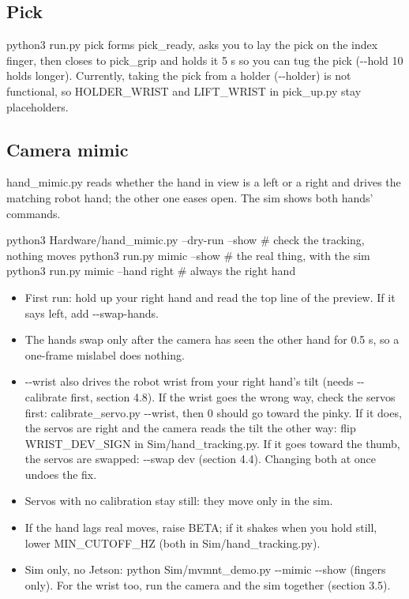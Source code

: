 \documentclass[11pt,letterpaper]{article}
\newcommand{\code}[1]{\textcolor{codeblue}{\ttfamily\smaller\relax #1}}
\begin{document}
\subsection{Pick}
\code{python3 run.py pick} forms \code{pick\_\allowbreak{}ready}, asks you to lay the pick on the index finger, then closes to \code{pick\_\allowbreak{}grip} and holds it 5 s so you can tug the pick (\code{-{}-{}hold 10} holds longer). Currently, taking the pick from a holder (\code{-{}-{}holder}) is not functional, so \code{HOLDER\_\allowbreak{}WRIST} and \code{LIFT\_\allowbreak{}WRIST} in \code{pick\_\allowbreak{}up.py} stay placeholders.


\subsection{Camera mimic}
\code{hand\_\allowbreak{}mimic.py} reads whether the hand in view is a left or a right and drives the matching robot hand; the other one eases open. The sim shows both hands' commands.

\begin{codeblock}
python3 Hardware/hand_mimic.py --dry-run --show   # check the tracking, nothing moves
python3 run.py mimic --show                       # the real thing, with the sim
python3 run.py mimic --hand right                 # always the right hand
\end{codeblock}
\begin{itemize}
  \item First run: hold up your right hand and read the top line of the preview. If it says \code{left}, add \code{-{}-{}swap-{}\allowbreak{}hands}.
  \item The hands swap only after the camera has seen the other hand for 0.5 s, so a one-frame mislabel does nothing.
  \item \code{-{}-{}wrist} also drives the robot wrist from your right hand's tilt (needs \code{-{}-{}calibrate} first, section 4.8). If the wrist goes the wrong way, check the servos first: \code{calibrate\_\allowbreak{}servo.py -{}-{}wrist}, then \code{25 0} should go toward the pinky. If it does, the servos are right and the camera reads the tilt the other way: flip \code{WRIST\_\allowbreak{}DEV\_\allowbreak{}SIGN} in \code{Sim/\allowbreak{}hand\_\allowbreak{}tracking.py}. If it goes toward the thumb, the servos are swapped: \code{-{}-{}swap dev} (section 4.4). Changing both at once undoes the fix.
  \item Servos with no calibration stay still: they move only in the sim.
  \item If the hand lags real moves, raise \code{BETA}; if it shakes when you hold still, lower \code{MIN\_\allowbreak{}CUTOFF\_\allowbreak{}HZ} (both in \code{Sim/\allowbreak{}hand\_\allowbreak{}tracking.py}).
  \item Sim only, no Jetson: \code{python Sim/\allowbreak{}mvmnt\_\allowbreak{}demo.py -{}-{}mimic -{}-{}show} (fingers only). For the wrist too, run the camera and the sim together (section 3.5).
\end{itemize}
\end{document}
